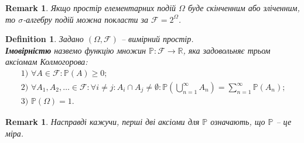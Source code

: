 \documentclass[a4paper, 10pt]{article}
\theoremstyle{theoremdd}
\newtheorem{definition}[theorem]{Definition}
\newtheorem{remark}[theorem]{Remark}
\begin{document}
\begin{remark}
Якщо простір елементарних подій $\Omega$ буде скінченним або зліченним, то $\sigma$-алгебру подій можна покласти за $\mathcal{F} = 2^\Omega$. 
\end{remark}

\iffalse
\begin{definition}
Маємо простір елементарних подій $\Omega$, створимо $\sigma$-алгебру $\mathcal{F}$ підмножин.\\
Така $\sigma$-алгебра називається \textbf{$\sigma$-алгеброю подій}. Вимірний простір $(\Omega,\mathcal{F})$ називають \textbf{вимірним простором стохастичного експерименту}.
\end{definition}
\fi

\begin{definition}
Задано $(\Omega,\mathcal{F})$ -- вимірний простір.\\
\textbf{Імовірністю} назвемо функцію множин $\mathbb{P} \colon \mathcal{F} \to \mathbb{R}$, яка задовольняє трьом аксіомам Колмогорова:
\begin{align*}
\text{1) $\forall A \in \mathcal{F}: \mathbb{P}(A) \geq 0;$} \\
\text{2) $\forall A_1,A_2,\dots \in \mathcal{F}: \forall i \neq j: A_i \cap A_j \neq \emptyset: \mathbb{P}\left( \bigcup_{n=1}^\infty A_n \right) = \sum_{n=1}^\infty \mathbb{P}(A_n)$;} \\
\text{3) $\mathbb{P}(\Omega) = 1$.}
\end{align*}
\end{definition}

\begin{remark}
Насправді кажучи, перші дві аксіоми для $\mathbb{P}$ означають, що $\mathbb{P}$ -- це міра.
\end{remark}

\iffalse
\begin{definition}
Задано $(\Omega,\mathcal{F})$ -- вимірний простір.\\
\textbf{Імовірністю} назвемо міру $\mathbb{P} \colon \mathcal{F} \to [0,+\infty)$, яка додатково має властивість:
\begin{align*}
\mathbb{P}(\Omega) = 1
\end{align*}
Трійка $(\Omega,\mathcal{F},\mathbb{P})$ називається \textbf{ймовірнісним простром}.
\end{definition}
\fi
\end{document}
